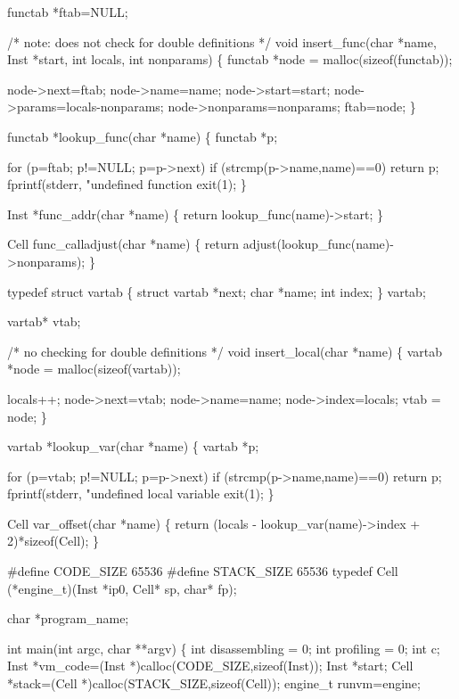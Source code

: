 \documentclass[10pt,english]{article}
\begin{document}
functab *ftab=NULL;

/* note: does not check for double definitions */
void insert_func(char *name, Inst *start, int locals, int nonparams)
\{
  functab *node = malloc(sizeof(functab));

  node->next=ftab;
  node->name=name;
  node->start=start;
  node->params=locals-nonparams;
  node->nonparams=nonparams;
  ftab=node;
\}

functab *lookup_func(char *name)
\{
  functab *p;

  for (p=ftab; p!=NULL; p=p->next)
    if (strcmp(p->name,name)==0)
      return p;
  fprintf(stderr, "undefined function %
  exit(1);
\}

Inst *func_addr(char *name)
\{
  return lookup_func(name)->start;
\}

Cell func_calladjust(char *name)
\{
  return adjust(lookup_func(name)->nonparams);
\}

typedef struct vartab \{
  struct vartab *next;
  char *name;
  int index;
\} vartab;

vartab* vtab;

/* no checking for double definitions */
void insert_local(char *name)
\{
  vartab *node = malloc(sizeof(vartab));

  locals++;
  node->next=vtab;
  node->name=name;
  node->index=locals;
  vtab = node;
\}

vartab *lookup_var(char *name)
\{
  vartab *p;

  for (p=vtab; p!=NULL; p=p->next)
    if (strcmp(p->name,name)==0)
      return p;
  fprintf(stderr, "undefined local variable %
  exit(1);
\}

Cell var_offset(char *name)
\{
  return (locals - lookup_var(name)->index + 2)*sizeof(Cell);
\}

#define CODE_SIZE 65536
#define STACK_SIZE 65536
typedef Cell (*engine_t)(Inst *ip0, Cell* sp, char* fp);

char *program_name;

int main(int argc, char **argv)
\{
  int disassembling = 0;
  int profiling = 0;
  int c;
  Inst *vm_code=(Inst *)calloc(CODE_SIZE,sizeof(Inst));
  Inst *start;
  Cell *stack=(Cell *)calloc(STACK_SIZE,sizeof(Cell));
  engine_t runvm=engine;
\end{document}
